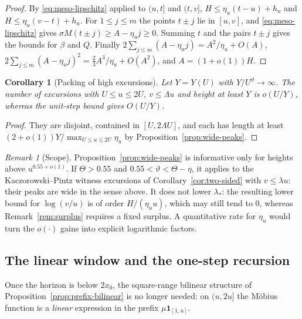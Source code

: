 \documentclass[11pt]{amsart}
\numberwithin{equation}{section}
\theoremstyle{plain}
\newtheorem{corollary}[theorem]{Corollary}
\theoremstyle{definition}
\theoremstyle{remark}
\newtheorem{remark}[theorem]{Remark}
\begin{document}
\begin{proof}
By \eqref{eq:meso-lipschitz} applied to $(u,t]$ and $(t,v]$,
$H\le\eta_u(t-u)+h_u$ and $H\le\eta_u(v-t)+h_u$. For $1\le j\le m$ the
points $t\pm j$ lie in $[u,v]$, and \eqref{eq:meso-lipschitz} gives
$\sigma M(t\pm j)\ge A-\eta_uj\ge0$. Summing $t$ and the pairs $t\pm j$
gives the bounds for $\beta$ and $Q$. Finally
$2\sum_{j\le m}(A-\eta_uj)=A^2/\eta_u+O(A)$,
$2\sum_{j\le m}(A-\eta_uj)^2=\frac23A^3/\eta_u+O(A^2)$, and $A=(1+o(1))H$.
\end{proof}

\begin{corollary}[Packing of high excursions]
\label{cor:packing}
Let $Y=Y(U)$ with $Y/U^\vartheta\to\infty$. The number of excursions with
$U\le u\le2U$, $v\le\Lambda u$ and height at least $Y$ is
$o(U/Y)$, whereas the unit-step bound gives $O(U/Y)$.
\end{corollary}

\begin{proof}
They are disjoint, contained in $[U,2\Lambda U]$, and each has length at
least $(2+o(1))Y/\max_{U\le u\le2U}\eta_u$ by
Proposition~\ref{prop:wide-peaks}.
\end{proof}

\begin{remark}[Scope]
\label{rem:wide-peaks-scope}
Proposition~\ref{prop:wide-peaks} is informative only for heights above
$u^{0.55+o(1)}$. If $\Theta>0.55$ and $0.55<\vartheta<\Theta-\eta$, it
applies to the Kaczorowski--Pintz witness excursions of
Corollary~\ref{cor:two-sided} with $v\le\lambda u$: their peaks are wide in
the sense above. It does not lower $\lambda_*$: the resulting lower bound
for $\log(v/u)$ is of order $H/(\eta_uu)$, which may still tend to $0$,
whereas Remark~\ref{rem:surplus} requires a fixed surplus. A quantitative
rate for $\eta_u$ would turn the $o(\cdot)$ gains into explicit
logarithmic factors.
\end{remark}



\subsection{The linear window and the one-step recursion}
\label{subsec:linear-window}

Once the horizon is below $2x_0$, the square-range bilinear structure of
Proposition~\ref{prop:prefix-bilinear} is no longer needed: on $(u,2u]$ the
M\"obius function is a \emph{linear} expression in the prefix
$\mu\mathbf 1_{[1,u]}$.
\end{document}
